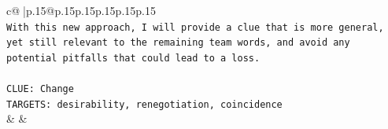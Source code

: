 \documentclass{article}
\begin{document}
{\begin{supertabular}{c@{$\;$}|p{.15\linewidth}@{}p{.15\linewidth}p{.15\linewidth}p{.15\linewidth}p{.15\linewidth}p{.15\linewidth}}
{{{\\ 
\texttt{With this new approach, I will provide a clue that is more general, yet still relevant to the remaining team words, and avoid any potential pitfalls that could lead to a loss.} \\
\\ 
\texttt{CLUE: Change} \\
\texttt{TARGETS: desirability, renegotiation, coincidence} \\
            }
        }
    }
    & & \\ \\

\end{supertabular}
}
\end{document}

